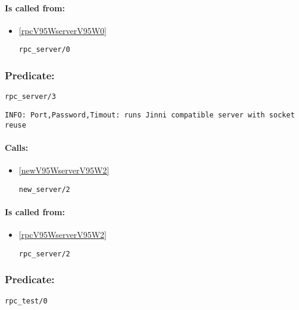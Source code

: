 \paragraph{Is called from:} 
\begin{itemize}
\item \ref{rpcV95WserverV95W0} 
\begin{verbatim}
rpc_server/0
\end{verbatim}

\end{itemize}

\subsubsection{Predicate:} \label{rpcV95WserverV95W3}

\begin{verbatim}
rpc_server/3
\end{verbatim}

{\small \begin{verbatim}
INFO: Port,Password,Timout: runs Jinni compatible server with socket reuse

\end{verbatim}}
\paragraph{Calls:} 
\begin{itemize}
\item \ref{newV95WserverV95W2} 
\begin{verbatim}
new_server/2
\end{verbatim}

\end{itemize}
\paragraph{Is called from:} 
\begin{itemize}
\item \ref{rpcV95WserverV95W2} 
\begin{verbatim}
rpc_server/2
\end{verbatim}

\end{itemize}

\subsubsection{Predicate:} \label{rpcV95WtestV95W0}

\begin{verbatim}
rpc_test/0
\end{verbatim}

